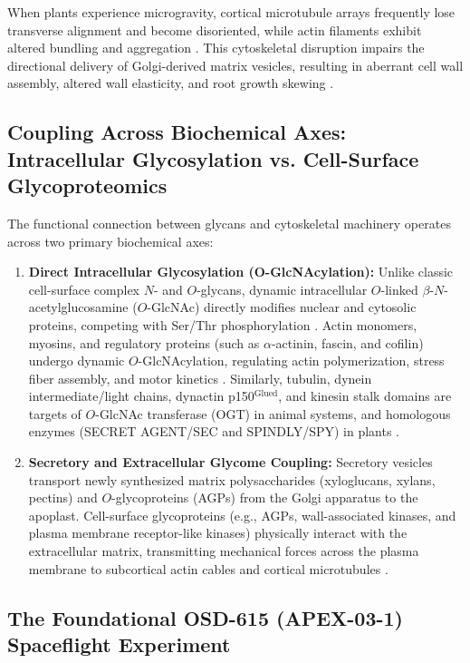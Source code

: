 When plants experience microgravity, cortical microtubule arrays frequently lose transverse alignment and become disoriented, while actin filaments exhibit altered bundling and aggregation \cite{Sievers1991, Blancaflor2014}. This cytoskeletal disruption impairs the directional delivery of Golgi-derived matrix vesicles, resulting in aberrant cell wall assembly, altered wall elasticity, and root growth skewing \cite{Nakashima2023, Califar2020}.

\subsection{Coupling Across Biochemical Axes: Intracellular Glycosylation vs. Cell-Surface Glycoproteomics}

The functional connection between glycans and cytoskeletal machinery operates across two primary biochemical axes:
\begin{enumerate}
    \item \textbf{Direct Intracellular Glycosylation (O-GlcNAcylation):} Unlike classic cell-surface complex $N$- and $O$-glycans, dynamic intracellular $O$-linked $\beta$-$N$-acetylglucosamine ($O$-GlcNAc) directly modifies nuclear and cytosolic proteins, competing with Ser/Thr phosphorylation \cite{Hart2011, Torres1984}. Actin monomers, myosins, and regulatory proteins (such as $\alpha$-actinin, fascin, and cofilin) undergo dynamic $O$-GlcNAcylation, regulating actin polymerization, stress fiber assembly, and motor kinetics \cite{Haltiwanger1992, Wells2002}. Similarly, tubulin, dynein intermediate/light chains, dynactin p150$^{\text{Glued}}$, and kinesin stalk domains are targets of $O$-GlcNAc transferase (OGT) in animal systems, and homologous enzymes (SECRET AGENT/SEC and SPINDLY/SPY) in plants \cite{Hart2007, Olszewski2010, Steiner2012}.
    \item \textbf{Secretory and Extracellular Glycome Coupling:} Secretory vesicles transport newly synthesized matrix polysaccharides (xyloglucans, xylans, pectins) and $O$-glycoproteins (AGPs) from the Golgi apparatus to the apoplast. Cell-surface glycoproteins (e.g., AGPs, wall-associated kinases, and plasma membrane receptor-like kinases) physically interact with the extracellular matrix, transmitting mechanical forces across the plasma membrane to subcortical actin cables and cortical microtubules \cite{Showalter2001, Seifert2007, Humphrey2007}.
\end{enumerate}

\subsection{The Foundational OSD-615 (APEX-03-1) Spaceflight Experiment}

